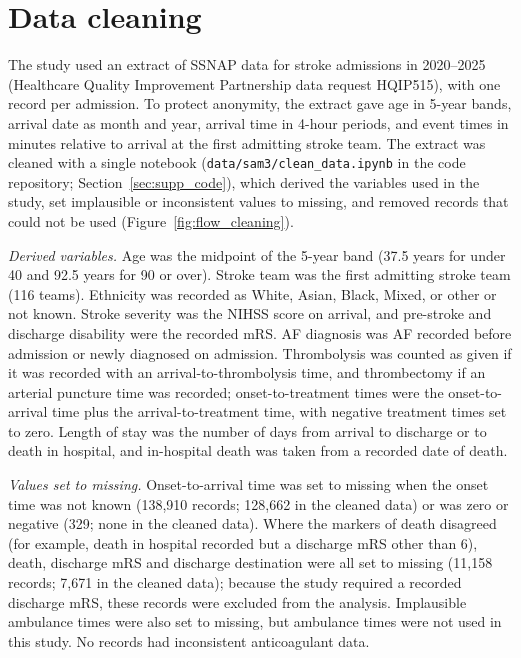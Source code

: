 \section{Data cleaning}\label{sec:supp_cleaning}

The study used an extract of SSNAP data for stroke admissions in 2020--2025 (Healthcare Quality Improvement Partnership data request HQIP515), with one record per admission. To protect anonymity, the extract gave age in 5-year bands, arrival date as month and year, arrival time in 4-hour periods, and event times in minutes relative to arrival at the first admitting stroke team. The extract was cleaned with a single notebook (\texttt{data/sam3/clean\_data.ipynb} in the code repository; Section~\ref{sec:supp_code}), which derived the variables used in the study, set implausible or inconsistent values to missing, and removed records that could not be used (Figure~\ref{fig:flow_cleaning}).

\textit{Derived variables.} Age was the midpoint of the 5-year band (37.5 years for under 40 and 92.5 years for 90 or over). Stroke team was the first admitting stroke team (116 teams). Ethnicity was recorded as White, Asian, Black, Mixed, or other or not known. Stroke severity was the NIHSS score on arrival, and pre-stroke and discharge disability were the recorded mRS. AF diagnosis was AF recorded before admission or newly diagnosed on admission. Thrombolysis was counted as given if it was recorded with an arrival-to-thrombolysis time, and thrombectomy if an arterial puncture time was recorded; onset-to-treatment times were the onset-to-arrival time plus the arrival-to-treatment time, with negative treatment times set to zero. Length of stay was the number of days from arrival to discharge or to death in hospital, and in-hospital death was taken from a recorded date of death.

\textit{Values set to missing.} Onset-to-arrival time was set to missing when the onset time was not known (138,910 records; 128,662 in the cleaned data) or was zero or negative (329; none in the cleaned data). Where the markers of death disagreed (for example, death in hospital recorded but a discharge mRS other than 6), death, discharge mRS and discharge destination were all set to missing (11,158 records; 7,671 in the cleaned data); because the study required a recorded discharge mRS, these records were excluded from the analysis. Implausible ambulance times were also set to missing, but ambulance times were not used in this study. No records had inconsistent anticoagulant data.

